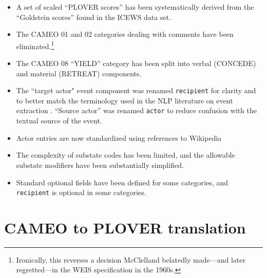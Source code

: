 \documentclass[11pt]{report}
\newcommand{\plcat}[1]{\textsf{#1}}
\newcommand{\txt}[1]{\texttt{#1}}
\newcommand{\fn}[1]{\footnote{#1}}
\begin{document}
{\begin{itemize}
\item A set of scaled ``PLOVER scores'' has been systematically derived from the ``Goldstein scores'' found in the ICEWS data set.

\item The CAMEO 01 and 02 categories dealing with comments have been eliminated.\fn{Ironically, this reverses a decision McClelland belatedly made---and later regretted---in the WEIS specification in the 1960s.}

\item The CAMEO 08 ``YIELD'' category has been split into verbal (\plcat{CONCEDE}) and material (\plcat{RETREAT}) components. 

\item The ``target actor" event component was renamed \txt{recipient} for clarity and to better match the terminology used in the NLP literature on event extraction \citep{halterman2020extracting}. ``Source actor'' was renamed \txt{actor} to reduce confusion with the textual source of the event. 

\item Actor entries are now standardized using references to Wikipedia  

\item The complexity of substate codes has been limited, and the allowable substate modifiers have been substantially simplified.

\item Standard optional fields have been defined for some categories, and \txt{recipient} is optional in some categories.

\end{itemize}


\section{CAMEO to PLOVER translation}\label{ssec:ctp}

}
\end{document}
